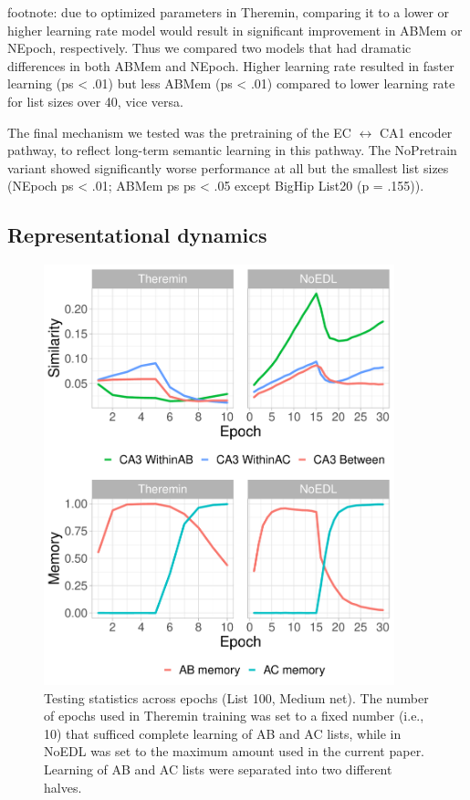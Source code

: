 \documentclass[11pt,twoside]{article}
\newif\myifpdf
\begin{document}
footnote: due to optimized parameters in Theremin, comparing it to a lower or higher learning rate model would result in significant improvement in ABMem or NEpoch, respectively. Thus we compared two models that had dramatic differences in both ABMem and NEpoch. Higher learning rate resulted in faster learning (ps < .01) but less ABMem (ps < .01) compared to lower learning rate for list sizes over 40, vice versa.

The final mechanism we tested was the pretraining of the EC $\leftrightarrow$ CA1 encoder pathway, to reflect long-term semantic learning in this pathway.  The NoPretrain variant showed significantly worse performance at all but the smallest list sizes (NEpoch ps < .01; ABMem ps ps < .05 except BigHip List20 (p = .155)). 

\subsection{Representational dynamics}

\begin{figure}
  \centering\includegraphics[width=4in]{fig_hip_edl_test_stats}
  \caption{\footnotesize Testing statistics across epochs (List 100, Medium net). The number of epochs used in Theremin training was set to a fixed number (i.e., 10) that sufficed complete learning of AB and AC lists, while in NoEDL was set to the maximum amount used in the current paper. Learning of AB and AC lists were separated into two different halves.}
\label{fig.test_stats}
\end{figure}
\end{document}
